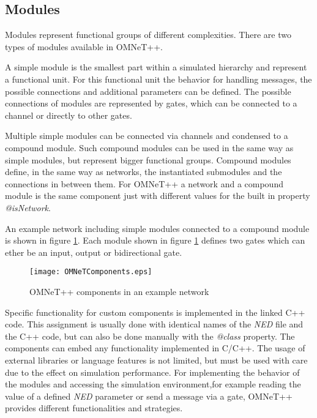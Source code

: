 \subsection{Modules}
\label{sec:omnet_components_modules}
Modules represent functional groups of different complexities.
There are two types of modules available in OMNeT++.

A simple module is the smallest part within a simulated hierarchy and represent a functional unit.
For this functional unit the behavior for handling messages, the possible connections and additional parameters can be defined. \cite[section 3.3]{omnet_manual}
The possible connections of modules are represented by gates, which can be connected to a channel or directly to other gates.

Multiple simple modules can be connected via channels and condensed to a compound module.
Such compound modules can be used in the same way as simple modules, but represent bigger functional groups.
Compound modules define, in the same way as networks, the instantiated submodules and the connections in between them. \cite[section 3.4]{omnet_manual}
For OMNeT++ a network and a compound module is the same component just with different values for the built in property \emph{@isNetwork}.

An example network including simple modules connected to a compound module is shown in figure \ref{fig:OMNeTComponents}.
Each module shown in figure \ref{fig:OMNeTComponents} defines two gates which can ether be an input, output or bidirectional gate.

\begin{figure}
    \centering
    \texttt{[image: OMNeTComponents.eps]}
    \caption{OMNeT++ components in an example network}
    \label{fig:OMNeTComponents}
\end{figure}

Specific functionality for custom components is implemented in the linked C++ code.
This assignment is usually done with identical names of the \emph{NED} file and the C++ code, but can also be done manually with the \emph{@class} property.
The components can embed any functionality implemented in C/C++.
The usage of external libraries or language features is not limited, but must be used with care due to the effect on simulation performance.
For implementing the behavior of the modules and accessing the simulation environment,for example reading the value of a defined \emph{NED} parameter or send a message via a gate, 
OMNeT++ provides different functionalities and strategies.

